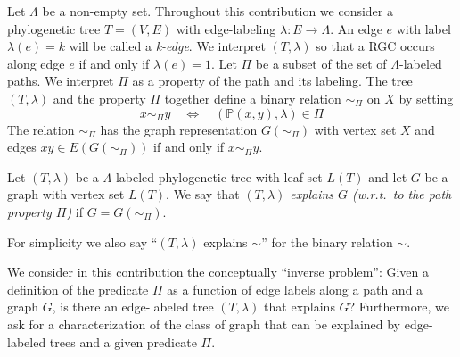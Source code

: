 \documentclass[smallextended]{svjour3}
\newcommand{\rev}[1]{\begingroup\color{blue}#1\endgroup}
\begin{document}
Let $\Lambda$ be a non-empty set. Throughout this contribution we consider
a \rev{phylogenetic tree} $T=(V,E)$ with edge-labeling $\lambda \colon E\to
\Lambda$. An edge $e$ with label $\lambda(e)=k$ will be called a
\emph{k-edge}. We interpret $(T,\lambda)$ so that a RGC occurs along edge
$e$ if and only if $\lambda(e)=1$. Let $\Pi$ be a subset of the set of
$\Lambda$-labeled paths. We interpret $\Pi$ as a property of the path and
its labeling. The tree $(T,\lambda)$ and the property $\Pi$ together define
a binary relation $\sim_{\Pi}$ on $X$ by setting
\begin{equation}
  x\sim_{\Pi} y \quad\iff\quad (\mathbb{P}(x,y),\lambda) \in \Pi 
\end{equation} 
The relation $\sim_{\Pi}$ has the graph representation $G(\sim_{\Pi})$ with
vertex set $X$ and edges $xy\in E(G(\sim_{\Pi}))$ if and only if
$x\sim_{\Pi} y$.

\begin{definition}
  Let $(T,\lambda)$ be a $\Lambda$-labeled phylogenetic tree with leaf set
  $L(T)$ and let $G$ be a graph with vertex set $L(T)$. We say that
  \emph{$(T,\lambda)$ explains $G$ (w.r.t.\ to the path property $\Pi$)} if
  $G=G(\sim_{\Pi})$.
\end{definition}
For simplicity we also say ``$(T,\lambda)$ explains $\sim$'' for the binary
relation $\sim$.

We consider in this contribution the conceptually ``inverse problem'':
Given a definition of the predicate $\Pi$ as a function of edge labels
along a path and a graph $G$, is there an edge-labeled tree $(T,\lambda)$
that explains $G$? Furthermore, we ask for a characterization of the class
of graph that can be explained by edge-labeled trees and a given predicate
$\Pi$.
\end{document}
